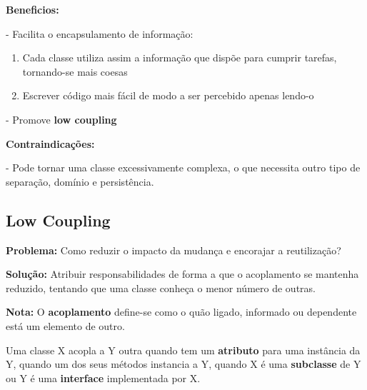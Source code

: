\documentclass{article}
\begin{document}
\begin{flushleft}
    \textbf{Beneficios:} 
    
    - Facilita o encapsulamento de informação:
    \begin{enumerate}
        \item Cada classe utiliza assim a informação que dispõe para cumprir tarefas, tornando-se
        mais coesas
        \item Escrever código mais fácil de modo a ser percebido apenas lendo-o
    \end{enumerate}

    - Promove \textbf{low coupling}
\end{flushleft}

\begin{flushleft}
    \textbf{Contraindicações:}

    - Pode tornar uma classe excessivamente complexa, o que necessita outro tipo de separação, domínio e persistência.
\end{flushleft}

\pagebreak

\subsection{Low Coupling}

\begin{flushleft}
    \textbf{Problema:} Como reduzir o impacto da mudança e encorajar a reutilização?

    \vspace{3mm}
    \textbf{Solução:} Atribuir responsabilidades de forma a que o acoplamento se mantenha
    reduzido, tentando que uma classe conheça o menor número de outras.

    \vspace{3mm}
    \textbf{Nota:} O \textbf{acoplamento} define-se como o quão ligado, informado ou dependente está um elemento de outro.
    
    Uma classe X acopla a Y outra quando tem um \textbf{atributo} para uma instância da Y, quando um dos seus
    métodos instancia a Y, quando X é uma \textbf{subclasse} de Y ou Y é uma \textbf{interface} implementada por X.
\end{flushleft}
\end{document}
